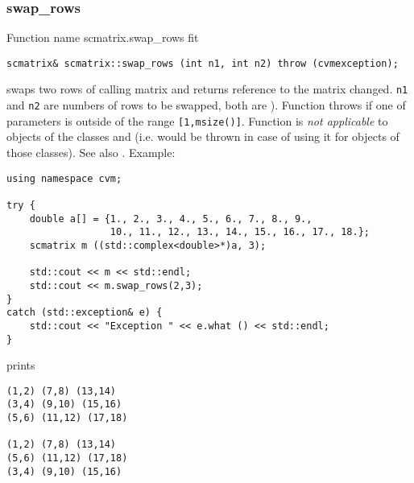 \subsubsection{swap\_rows}
Function%
\pdfdest name {scmatrix.swap_rows} fit
\begin{verbatim}
scmatrix& scmatrix::swap_rows (int n1, int n2) throw (cvmexception);
\end{verbatim}
swaps two rows of  calling matrix and returns  reference to
the matrix changed. \verb"n1" and \verb"n2" are
 numbers of rows to be swapped, 
both are \Based).
Function throws  
if one of  parameters is outside of the range
\verb"[1,msize()]".
Function is 
\emph{not applicable} to objects of the classes
 and
 (i.e.  would be thrown
in case of using it for objects of those classes).
See also .
Example:
\begin{Verbatim}
using namespace cvm;

try {
    double a[] = {1., 2., 3., 4., 5., 6., 7., 8., 9.,
                  10., 11., 12., 13., 14., 15., 16., 17., 18.};
    scmatrix m ((std::complex<double>*)a, 3);

    std::cout << m << std::endl;
    std::cout << m.swap_rows(2,3);
}
catch (std::exception& e) {
    std::cout << "Exception " << e.what () << std::endl;
}
\end{Verbatim}
prints
\begin{Verbatim}
(1,2) (7,8) (13,14)
(3,4) (9,10) (15,16)
(5,6) (11,12) (17,18)

(1,2) (7,8) (13,14)
(5,6) (11,12) (17,18)
(3,4) (9,10) (15,16)
\end{Verbatim}
\newpage


